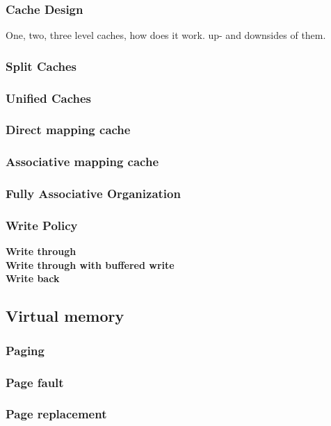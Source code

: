 \documentclass[titlepage, a4paper]{article}
\begin{document}
\subsubsection{Cache Design}
One, two, three level caches, how does it work. up- and downsides of them.

\subsubsection{Split Caches}

\subsubsection{Unified Caches}

\subsubsection{Direct mapping cache}

\subsubsection{Associative mapping cache}

\subsubsection{Fully Associative Organization}

\subsubsection{Write Policy}
\textbf{Write through} \\
\textbf{Write through with buffered write} \\
\textbf{Write back} \\

\subsection{Virtual memory}
\subsubsection{Paging}
\subsubsection{Page fault}
\subsubsection{Page replacement}
\end{document}
